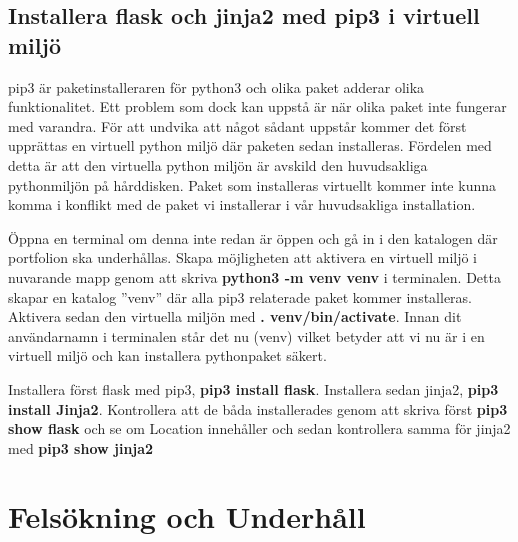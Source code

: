 \documentclass{TDP003mall}
\begin{document}
\subsection{Installera flask och jinja2 med pip3 i virtuell miljö}
pip3 är paketinstalleraren för python3 och olika paket adderar olika funktionalitet. Ett problem som dock kan uppstå är när olika paket inte fungerar med varandra. För att undvika att något sådant uppstår kommer det först upprättas en virtuell python miljö där paketen sedan installeras. Fördelen med detta är att den virtuella python miljön är avskild den huvudsakliga pythonmiljön på hårddisken. Paket som installeras virtuellt kommer inte kunna komma i konflikt med de paket vi installerar i vår huvudsakliga installation.

Öppna en terminal om denna inte redan är öppen och gå in i den katalogen där portfolion ska underhållas. Skapa möjligheten att aktivera en virtuell miljö i nuvarande mapp genom att skriva \textbf{python3 -m venv venv} i terminalen. Detta skapar en katalog ''venv'' där alla pip3 relaterade paket kommer installeras. Aktivera sedan den virtuella miljön med \textbf{. venv/bin/activate}. Innan dit användarnamn i terminalen står det nu (venv) vilket betyder att vi nu är i en virtuell miljö och kan installera pythonpaket säkert.

Installera först flask med pip3, \textbf{pip3 install flask}. Installera sedan jinja2, \textbf{pip3 install Jinja2}. Kontrollera att de båda installerades genom att skriva först \textbf{pip3 show flask} och se om Location innehåller  och sedan kontrollera samma för jinja2 med  \textbf{pip3 show jinja2}



\section{Felsökning och Underhåll}
\end{document}
